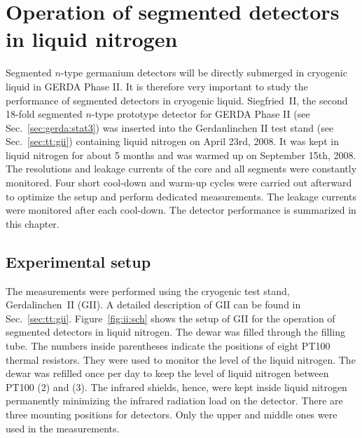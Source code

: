 \chapter[Operation of segmented detectors in LN$_{2}$]{Operation of segmented detectors in liquid nitrogen}
\label{cha:GII}
Segmented $n$-type germanium detectors will be directly submerged in cryogenic liquid in GERDA Phase II. It is therefore very important to study the performance of segmented detectors in cryogenic liquid. Siegfried~II, the second 18-fold segmented $n$-type prototype detector for GERDA Phase II (see Sec.~\ref{sec:gerda:stat3}) was inserted into the Gerdanlinchen II test stand (see Sec.~\ref{sec:tt:gii}) containing liquid nitrogen on April 23rd, 2008. It was kept in liquid nitrogen for about 5 months and was warmed up on September 15th, 2008. The resolutions and leakage currents of the core and all segments were constantly monitored. Four short cool-down and warm-up cycles were carried out afterward to optimize the setup and perform dedicated measurements. The leakage currents were monitored after each cool-down. The detector performance is summarized in this chapter.

\section{Experimental setup}
\label{sec:gii:setup}
The measurements were performed using the cryogenic test stand, Gerdalinchen~II (GII). A detailed description of GII can be found in Sec.~\ref{sec:tt:gii}.  Figure~\ref{fig:ii:sch} shows the setup of GII for the operation of segmented detectors in liquid nitrogen. The dewar was filled through the filling tube. The numbers inside parentheses indicate the positions of eight PT100 thermal resistors. They were used to monitor the level of the liquid nitrogen. The dewar was refilled once per day to keep the level of liquid nitrogen between PT100 (2) and (3). The infrared shields, hence, were kept inside liquid nitrogen permanently minimizing the infrared radiation load on the detector. There are three mounting positions for detectors. Only the upper and middle ones were used in the measurements.

